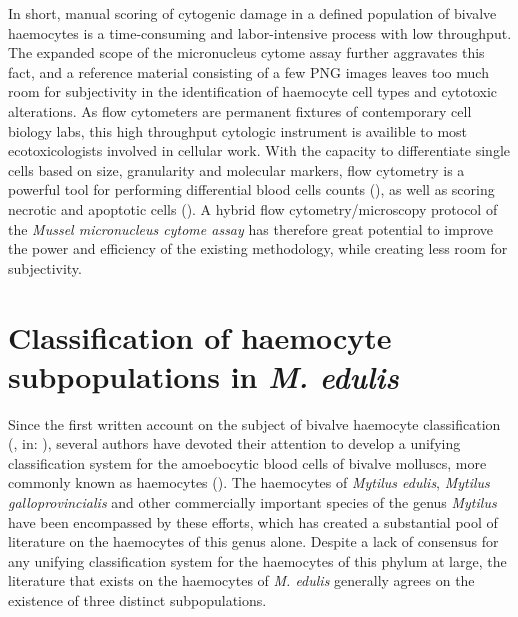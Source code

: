 In short, manual scoring of cytogenic damage in a defined population of bivalve haemocytes is a time-consuming and labor-intensive process with low throughput. The expanded scope of the micronucleus cytome assay further aggravates this fact, and a reference material consisting of a few PNG images leaves too much room for subjectivity in the identification of haemocyte cell types and cytotoxic alterations. As flow cytometers are permanent fixtures of contemporary cell biology labs, this high throughput cytologic instrument is availible to most ecotoxicologists involved in cellular work. With the capacity to differentiate single cells based on size, granularity and molecular markers, flow cytometry is a powerful tool for performing differential blood cells counts (\cite{Shapiro2004}), as well as scoring necrotic and apoptotic cells (\cite{Shapiro2003}). A hybrid flow cytometry/microscopy protocol of the \emph{Mussel micronucleus cytome assay} has therefore great potential to improve the power and efficiency of the existing methodology, while creating less room for subjectivity.

\section{Classification of haemocyte subpopulations in \emph{M. edulis}}
\label{subsection:haemocyte_classification}
Since the first written account on the subject of bivalve haemocyte classification (\cite{Cuenot1891}, in: \cite{Cheng1980}), several authors have devoted their attention to develop a unifying classification system for the amoebocytic blood cells of bivalve molluscs, more commonly known as haemocytes (\cite{Cheng1980, delaBallina2022}). The haemocytes of \emph{Mytilus edulis}, \emph{Mytilus galloprovincialis} and other commercially important species of the genus \emph{Mytilus} have been encompassed by these efforts, which has created a substantial pool of literature on the haemocytes of this genus alone. Despite a lack of consensus for any unifying classification system for the haemocytes of this phylum at large, the literature that exists on the haemocytes of \emph{M. edulis} generally agrees on the existence of three distinct subpopulations.

